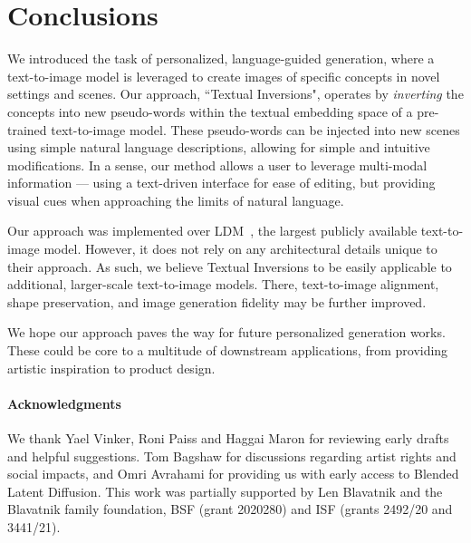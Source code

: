 \section{Conclusions}
We introduced the task of personalized, language-guided generation, where a text-to-image model is leveraged to create images of specific concepts in novel settings and scenes.
Our approach, ``Textual Inversions", operates by \textit{inverting} the concepts into new pseudo-words within the textual embedding space of a pre-trained text-to-image model. These pseudo-words can be injected into new scenes using simple natural language descriptions, allowing for simple and intuitive modifications. In a sense, our method allows a user to leverage multi-modal information --- using a text-driven interface for ease of editing, but providing visual cues when approaching the limits of natural language.

Our approach was implemented over LDM~\citep{rombach2021highresolution}, the largest publicly available text-to-image model. However, it does not rely on any architectural details unique to their approach. As such, we believe Textual Inversions to be easily applicable to additional, larger-scale text-to-image models. There, text-to-image alignment, shape preservation, and image generation fidelity may be further improved.

We hope our approach paves the way for future personalized generation works. These could be core to a multitude of downstream applications, from providing artistic inspiration to product design. 

\paragraph{Acknowledgments} We thank Yael Vinker, Roni Paiss and Haggai Maron for reviewing early drafts and helpful suggestions. Tom Bagshaw for discussions regarding artist rights and social impacts, and Omri Avrahami for providing us with early access to Blended Latent Diffusion. This work was partially supported by Len Blavatnik and the Blavatnik family foundation, BSF (grant 2020280) and ISF (grants 2492/20 and 3441/21).

\clearpage